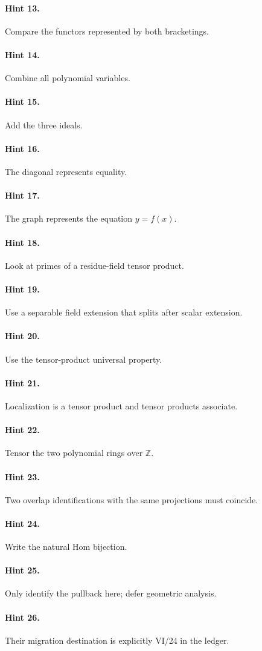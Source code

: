 \paragraph{Hint 13.} Compare the functors represented by both bracketings.
\paragraph{Hint 14.} Combine all polynomial variables.
\paragraph{Hint 15.} Add the three ideals.
\paragraph{Hint 16.} The diagonal represents equality.
\paragraph{Hint 17.} The graph represents the equation $y=f(x)$.
\paragraph{Hint 18.} Look at primes of a residue-field tensor product.
\paragraph{Hint 19.} Use a separable field extension that splits after scalar extension.
\paragraph{Hint 20.} Use the tensor-product universal property.
\paragraph{Hint 21.} Localization is a tensor product and tensor products associate.
\paragraph{Hint 22.} Tensor the two polynomial rings over $\mathbb Z$.
\paragraph{Hint 23.} Two overlap identifications with the same projections must coincide.
\paragraph{Hint 24.} Write the natural Hom bijection.
\paragraph{Hint 25.} Only identify the pullback here; defer geometric analysis.
\paragraph{Hint 26.} Their migration destination is explicitly VI/24 in the ledger.